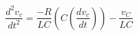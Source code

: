 \documentclass[preview]{standalone}
\begin{document}
\begin{center}
\[\frac{d^2v_c}{dt^2} = \frac{-R}{LC} \left(C \left(\frac{dv_c}{dt}\right) \right) - \frac{v_C}{LC}\]
\end{center}
\end{document}
